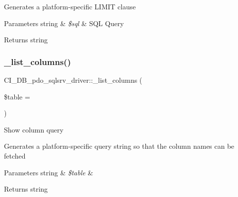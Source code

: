 Generates a platform-\/specific L\+I\+M\+IT clause


\begin{DoxyParams}[1]{Parameters}
string & {\em \$sql} & S\+QL Query \\
\hline
\end{DoxyParams}
\begin{DoxyReturn}{Returns}
string 
\end{DoxyReturn}
\mbox{\label{class_c_i___d_b__pdo__sqlsrv__driver_ae3cf2d3b9c7e6c4e2984ca5239e365bd}} 
\subsubsection{\texorpdfstring{\+\_\+list\+\_\+columns()}{\_list\_columns()}}
{\footnotesize\ttfamily C\+I\+\_\+\+D\+B\+\_\+pdo\+\_\+sqlsrv\+\_\+driver\+::\+\_\+list\+\_\+columns (\begin{DoxyParamCaption}\item[{}]{\$table = {\ttfamily \textquotesingle{}\textquotesingle{}} }\end{DoxyParamCaption})\hspace{0.3cm}{\ttfamily [protected]}}

Show column query

Generates a platform-\/specific query string so that the column names can be fetched


\begin{DoxyParams}[1]{Parameters}
string & {\em \$table} & \\
\hline
\end{DoxyParams}
\begin{DoxyReturn}{Returns}
string 
\end{DoxyReturn}
\mbox{\label{class_c_i___d_b__pdo__sqlsrv__driver_a003ef9a5739ce86fdb32df81e01e4402}} 
